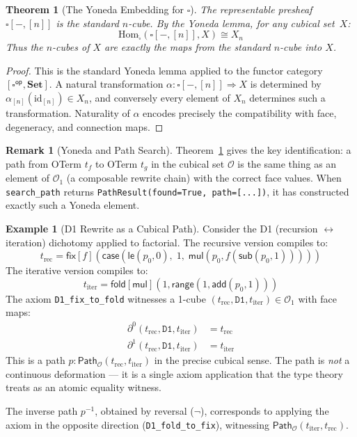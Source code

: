 \documentclass[11pt,a4paper]{report}
\theoremstyle{definition}
\newtheorem{example}[definition]{Example}
\newtheorem{remark}[definition]{Remark}
\theoremstyle{plain}
\newtheorem{theorem}[definition]{Theorem}
\newcommand{\Path}{\mathsf{Path}}
\newcommand{\Set}{\mathbf{Set}}
\newcommand{\op}{\mathsf{op}}
\begin{document}
\begin{theorem}[The Yoneda Embedding for $\square$]
\label{thm:yoneda-cube}
The representable presheaf $\square[-, [n]]$ is the standard $n$-cube.
By the Yoneda lemma, for any cubical set~$X$:
\[
  \mathrm{Hom}_{\widehat{\square}}(\square[-, [n]], X) \cong X_n
\]
Thus the $n$-cubes of $X$ are exactly the maps from the standard $n$-cube into $X$.
\end{theorem}

\begin{proof}
This is the standard Yoneda lemma applied to the functor category
$[\square^{\op}, \Set]$.  A natural transformation
$\alpha : \square[-, [n]] \Rightarrow X$ is determined by
$\alpha_{[n]}(\mathrm{id}_{[n]}) \in X_n$, and conversely every element
of $X_n$ determines such a transformation.  Naturality of $\alpha$
encodes precisely the compatibility with face, degeneracy, and
connection maps.
\end{proof}

\begin{remark}[Yoneda and Path Search]
\label{rem:yoneda-path-search}
Theorem~\ref{thm:yoneda-cube} gives the key identification: a path
from OTerm $t_f$ to OTerm $t_g$ in the cubical set $\mathcal{O}$ is
the same thing as an element of $\mathcal{O}_1$ (a composable rewrite
chain) with the correct face values.  When \texttt{search\_path}
returns \texttt{PathResult(found=True, path=[...])}, it has constructed
exactly such a Yoneda element.
\end{remark}

\begin{example}[D1 Rewrite as a Cubical Path]
\label{ex:d1-cubical}
Consider the D1 (recursion $\leftrightarrow$ iteration) dichotomy
applied to factorial.  The recursive version compiles to:
\[
  t_{\mathrm{rec}} = \mathsf{fix}[f](\mathsf{case}(\mathsf{le}(p_0, 0),\;
  1,\; \mathsf{mul}(p_0, f(\mathsf{sub}(p_0, 1)))))
\]
The iterative version compiles to:
\[
  t_{\mathrm{iter}} = \mathsf{fold}[\mathsf{mul}](1, \mathsf{range}(1, \mathsf{add}(p_0, 1)))
\]
The axiom \texttt{D1\_fix\_to\_fold} witnesses a 1-cube
$(t_{\mathrm{rec}}, \texttt{D1}, t_{\mathrm{iter}}) \in \mathcal{O}_1$
with face maps:
\begin{align}
  \partial^0(t_{\mathrm{rec}}, \texttt{D1}, t_{\mathrm{iter}}) &= t_{\mathrm{rec}} \\
  \partial^1(t_{\mathrm{rec}}, \texttt{D1}, t_{\mathrm{iter}}) &= t_{\mathrm{iter}}
\end{align}
This is a path $p : \Path_\mathcal{O}(t_{\mathrm{rec}}, t_{\mathrm{iter}})$
in the precise cubical sense.  The path is \emph{not} a continuous
deformation --- it is a single axiom application that the type theory
treats as an atomic equality witness.

The inverse path $p^{-1}$, obtained by reversal ($\lnot$), corresponds
to applying the axiom in the opposite direction
(\texttt{D1\_fold\_to\_fix}), witnessing
$\Path_\mathcal{O}(t_{\mathrm{iter}}, t_{\mathrm{rec}})$.
\end{example}
\end{document}
